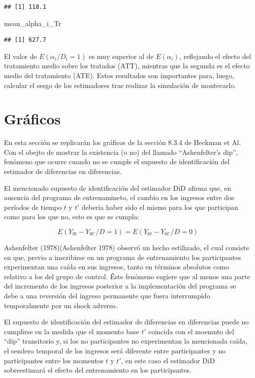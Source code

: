 \documentclass[]{article}
\newenvironment{Shaded}{\begin{snugshade}}{\end{snugshade}}
\newcommand{\NormalTok}[1]{{#1}}
\begin{document}
\begin{verbatim}
## [1] 118.1
\end{verbatim}

\begin{Shaded}
\begin{Highlighting}[]
\NormalTok{mean_alpha_i_Tr}
\end{Highlighting}
\end{Shaded}

\begin{verbatim}
## [1] 627.7
\end{verbatim}

El valor de $E(\alpha_{i}/D_{i}=1)$ es muy superior al de
$E(\alpha_{i})$, reflejando el efecto del tratamiento medio sobre los
tratados (ATT), mientras que la segunda es el efecto medio del
tratamiento (ATE). Estos resultados son importantes para, luego,
calcular el sesgo de los estimadores tras realizar la simulación de
montecarlo.

\section{Gráficos}\label{graficos}

En esta sección se replicarán los gráficos de la sección 8.3.4 de
Heckman et Al. Con el obejto de mostrar la existencia (o no) del llamado
``Ashenfelter's dip'', fenómeno que ocurre cuando no se cumple el
supuesto de identificación del estimador de diferencias en diferencias.

El mencionado supuesto de identificación del estimador DiD afirma que,
en ausencia del programa de entrenamineto, el cambio en los ingresos
entre dos períodos de tiempo $t$ y $t'$ debería haber sido el mismo para
los que participan como para los que no, esto es que se cumpla:

\[ E(Y_{0t}-Y_{0t'}/D=1)=E(Y_{0t}-Y_{0t'}/D=0) \]

Ashenfelter (1978)(Ashenfelter 1978) observó un hecho estilizado, el
cual consiste en que, previo a inscribirse en un programa de
entrenamiento los participantes experimentan una caída en sus ingresos,
tanto en términos absolutos como relativo a los del grupo de control.
Éste fenómeno sugiere que al menos una parte del incremento de los
ingresos posterior a la implementación del programa se debe a una
reversión del ingreso permanente que fuera interrumpido temporalmente
por un shock adverso.

El supuesto de identificación del estimador de diferencias en
diferencias puede no cumplirse en la medida que el momento base $t'$
coincida con el moemnto del ``dip'' transitorio y, si los no
participantes no experimentan la mencionada caída, el sendero temporal
de los ingresos será diferente entre participantes y no participantes
entre los momentos $t$ y $t'$, en este caso el estimador DiD
sobreestimará el efecto del entrenamiento en los participantes.
\end{document}
